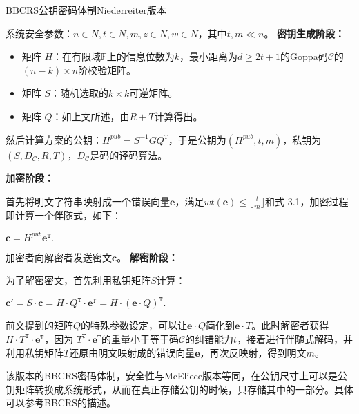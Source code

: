 \begin{breakablealgorithm}
	\small
	\renewcommand{\algorithmicrequire}{\textbf{Input:}}
	\renewcommand{\algorithmicensure}{\textbf{Output:}}
	\caption{BBCRS公钥密码体制Niederreiter版本}
	\label{alg:BBCRS}
	\begin{algorithmic}	
		\State
		系统安全参数：$n \in N, t \in N, m, z \in N, w \in N$，其中$t,m \ll n$。
		\State
		\textbf{密钥生成阶段：}
		
		\begin{itemize}
			\item 矩阵 $H$：在有限域$\mathbb{F}$上的信息位数为$k$，最小距离为$d \geq 2t + 1$的Goppa码$\mathcal{C}$的$(n-k) \times n$阶校验矩阵。
			\item 矩阵 $S$：随机选取的$k \times k$可逆矩阵。
			\item 矩阵 $Q$：如上文所述，由$R + T$计算得出。
		\end{itemize}
		
		然后计算方案的公钥：$H^{pub} = S^{-1}GQ^\mathtt{T}$，于是公钥为$(H^{pub}, t, m)$，私钥为$(S,D_\mathcal{C},R,T)$，$D_\mathcal{C}$是码的译码算法。
		
		\State
		\textbf{加密阶段：}
		
		首先将明文字符串映射成一个错误向量$\mathbf{e}$，满足$wt(\mathbf{e}) \leq \lfloor \frac{t}{m} \rfloor$和式 3.1，加密过程即计算一个伴随式，如下：
		
		\begin{center}
			$\mathbf{c} = H^{pub}\mathbf{e}^\mathtt{T}.$
		\end{center}
		
		加密者向解密者发送密文$\mathbf{c}$。
		\State
		\textbf{解密阶段：}
		
		为了解密密文，首先利用私钥矩阵$S$计算：
		\begin{center}
			$\mathbf{c}' = S \cdot \mathbf{c} = H \cdot Q^\mathtt{T} \cdot \mathbf{e}^\mathtt{T} = H \cdot (\mathbf{e} \cdot Q)^\mathtt{T}.$
		\end{center}
		
		前文提到的矩阵$Q$的特殊参数设定，可以让$\mathbf{e} \cdot Q$简化到$\mathbf{e} \cdot T$。此时解密者获得$H \cdot T^\mathtt{T} \cdot \mathbf{e}^\mathtt{T}$，因为 $T^\mathtt{T} \cdot \mathbf{e}^\mathtt{T}$的重量小于等于码$\mathcal{C}$的纠错能力$t$，接着进行伴随式解码，并利用私钥矩阵$T$还原由明文映射成的错误向量$\mathbf{e}$，再次反映射，得到明文$m$。
	\end{algorithmic}
\end{breakablealgorithm}
该版本的BBCRS密码体制，安全性与McEliece版本等同，在公钥尺寸上可以是公钥矩阵转换成系统形式，从而在真正存储公钥的时候，只存储其中的一部分。具体可以参考BBCRS的描述。

